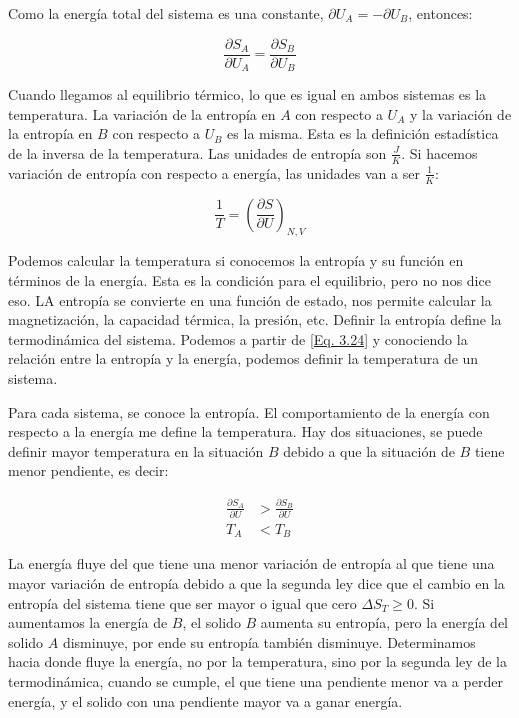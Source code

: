 \documentclass[11pt,fleqn]{book}
\begin{document}
Como la energía total del sistema es una constante, $\partial U_{A}=-\partial U_{B}$, entonces:

\begin{equation}
     \frac{\partial S_{A}}{\partial U_{A}}=\frac{\partial S_{B}}{\partial U_{B}}
    \label{Eq. 3.23}
\end{equation}

Cuando llegamos al equilibrio térmico, lo que es igual en ambos sistemas es la temperatura. La variación de la entropía en $A$ con respecto a $U_{A}$ y la variación de la entropía en $B$ con respecto a $U_{B}$ es la misma. Esta es la definición estadística de la inversa de la temperatura. Las unidades de entropía son $\frac{J}{K}$. Si hacemos variación de entropía con respecto a energía, las unidades van a ser $\frac{1}{K}$:

\begin{equation}
\frac{1}{T}=\left(\frac{\partial S}{\partial U}\right)_{N,V}
    \label{Eq. 3.24}
\end{equation}

Podemos calcular la temperatura si conocemos la entropía y su función en términos de la energía. Esta es la condición para el equilibrio, pero no nos dice eso. LA entropía se convierte en una función de estado, nos permite calcular la magnetización, la capacidad térmica, la presión, etc. Definir la entropía define la termodinámica del sistema. Podemos a partir de \ref{Eq. 3.24} y conociendo la relación entre la entropía y la energía, podemos definir la temperatura de un sistema.




Para cada sistema, se conoce la entropía. El comportamiento de la energía con respecto a la energía me define la temperatura. Hay dos situaciones, se puede definir mayor temperatura en la situación $B$ debido a que la situación de $B$ tiene menor pendiente, es decir: 

\begin{equation*}
    \begin{split}
        \frac{\partial S_{A}}{\partial U}&>\frac{\partial S_{B}}{\partial U}\\
        T_{A}&<T_{B}
    \end{split}
\end{equation*}

La energía fluye del que tiene una menor variación de entropía al que tiene una mayor variación de entropía  debido a que la segunda ley dice que el cambio en la entropía del sistema tiene que ser mayor o igual que cero $\Delta S_{T}\geqslant0$. Si aumentamos la energía de $B$, el solido $B$ aumenta su entropía, pero la energía del solido $A$ disminuye, por ende su entropía también disminuye. Determinamos hacia donde fluye la energía, no por la temperatura, sino por la segunda ley de la termodinámica, cuando se cumple, el que tiene una pendiente menor va a perder energía, y el solido con una pendiente mayor va a ganar energía. 
\end{document}
